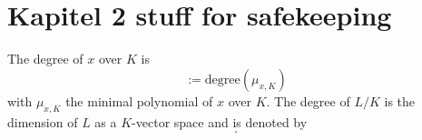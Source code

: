 \section{Kapitel 2 stuff for safekeeping}
\begin{definition}
    The degree of $x$ over $K$ is
    \begin{equation*}
        [x:K] :=\text{degree}(\mu_{x,K})
        \end{equation*}
        with $\mu_{x,K}$ the minimal polynomial of $x$ over $K$. \newline
    The degree of $L/K$ is the dimension of $L$ as a $K$-vector space and is denoted by
    \begin{equation*}
        [L:K].
    \end{equation*}
\end{definition}

